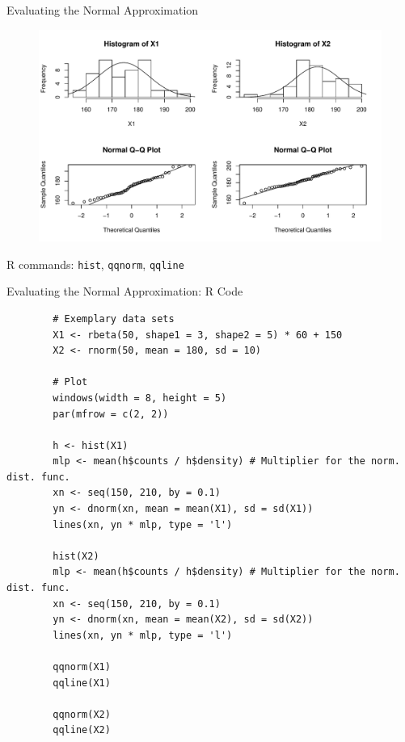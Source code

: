\begin{frame}{Evaluating the Normal Approximation}

    \begin{figure}
        \includegraphics[width=\linewidth]{R/plots/eval_norm_approx}
    \end{figure}

    {\tiny R commands: \texttt{hist}, \texttt{qqnorm}, \texttt{qqline}}

\end{frame}

\begin{frame}[fragile]{Evaluating the Normal Approximation: R Code}

    {\tiny
    \begin{verbatim}
        # Exemplary data sets
        X1 <- rbeta(50, shape1 = 3, shape2 = 5) * 60 + 150
        X2 <- rnorm(50, mean = 180, sd = 10)

        # Plot
        windows(width = 8, height = 5)
        par(mfrow = c(2, 2))

        h <- hist(X1)
        mlp <- mean(h$counts / h$density) # Multiplier for the norm. dist. func.
        xn <- seq(150, 210, by = 0.1)
        yn <- dnorm(xn, mean = mean(X1), sd = sd(X1))
        lines(xn, yn * mlp, type = 'l')
        
        hist(X2)
        mlp <- mean(h$counts / h$density) # Multiplier for the norm. dist. func.
        xn <- seq(150, 210, by = 0.1)
        yn <- dnorm(xn, mean = mean(X2), sd = sd(X2))
        lines(xn, yn * mlp, type = 'l')
        
        qqnorm(X1)
        qqline(X1)
        
        qqnorm(X2)
        qqline(X2)
    \end{verbatim}
    }

\end{frame}

